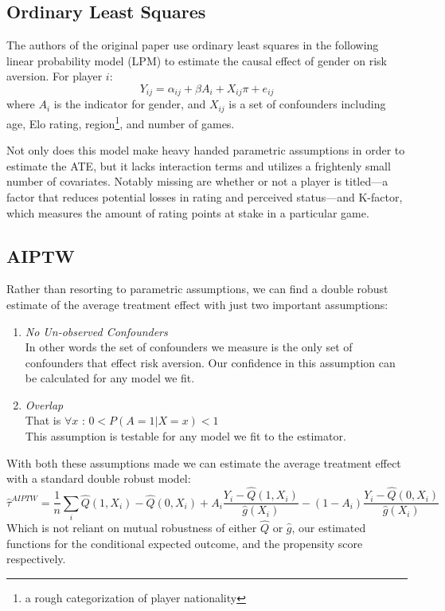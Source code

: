 \documentclass[letterpaper, 11pt]{article}
\begin{document}
    \subsection*{Ordinary Least Squares}
        
        The authors of the original paper use ordinary least squares in the following linear probability model (LPM) to estimate the causal effect of gender on risk aversion. For player $i$:
        $$Y_{ij} = \alpha_{ij} + \beta A_{i} + X_{ij} \pi + e_{ij}$$
        where $A_i$ is the indicator for gender, and $X_{ij}$ is a set of confounders including age, Elo rating, region\footnote{a rough categorization of player nationality}, and number of games.

        Not only does this model make heavy handed parametric assumptions in order to estimate the ATE, but it lacks interaction terms and utilizes a frightenly small number of covariates.
        Notably missing are whether or not a player is titled---a factor that reduces potential losses in rating and perceived status---and K-factor, which measures the amount of rating points at stake in a particular game. 

    \subsection*{AIPTW}
        
        Rather than resorting to parametric assumptions, we can find a double robust estimate of the average treatment effect with just two important assumptions:
        \begin{enumerate}
        \item \emph{No Un-observed Confounders}\\
              In other words the set of confounders we measure is the only set of confounders that effect risk aversion. Our confidence in this assumption can be calculated for any model we fit.
        \item \emph{Overlap}\\
              That is $\forall x$ : $ 0 < P( A = 1 | X = x ) < 1 $ \\
              This assumption is testable for any model we fit to the estimator.
        \end{enumerate}

        With both these assumptions made we can estimate the average treatment effect with a standard double robust model:
        $$ \hat{\tau}^{AIPTW} = \frac{1}{n} \sum_i \hat{Q}(1, X_i) - \hat{Q}(0, X_i) + A_i \frac{Y_i - \hat{Q}(1, X_i)}{\hat{g}(X_i)} - ( 1 - A_i ) \frac{Y_i - \hat{Q}(0, X_i)}{\hat{g}(X_i)} $$
        Which is not reliant on mutual robustness of either $\hat{Q}$ or $\hat{g}$, our estimated functions for the conditional expected outcome, and the propensity score respectively. 
\end{document}
